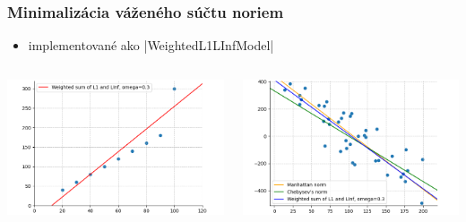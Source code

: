 \documentclass[presentation.tex]{subfiles}
\begin{document}
\begin{frame}
	\frametitle{Minimalizácia váženého súčtu noriem}
	\begin{itemize}
		\item implementované ako \pyth|WeightedL1LInfModel|
	\end{itemize}
	\begin{columns}
		\begin{column}{0.5\textwidth}
			\centering
			\includegraphics[width=\linewidth]{../report/figs/weighted_linear_with_outlier_cropped.png}
		\end{column}
		\begin{column}{0.5\textwidth}
			\centering
			\includegraphics[width=\linewidth]{../report/figs/all_three_random_cropped.png}
		\end{column}
	\end{columns}
	
\end{frame}
	
\end{document}
